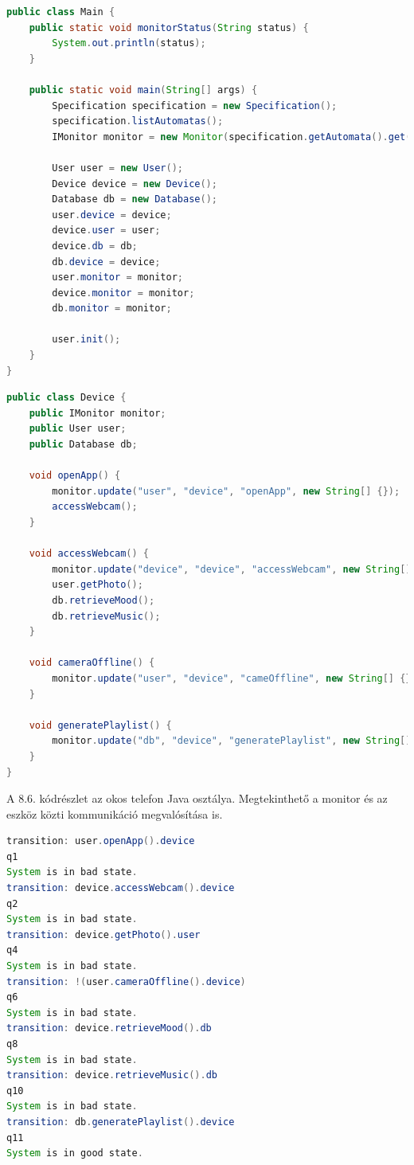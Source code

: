 \begin{lstlisting}[language=java, frame=single, float=ht!, caption={Az okos telefon és hozzá tartozó monitor fel konfigurálásának Java implementációja.},captionpos=b]
public class Main {
	public static void monitorStatus(String status) {
		System.out.println(status);
	}

	public static void main(String[] args) {
		Specification specification = new Specification();
		specification.listAutomatas();
		IMonitor monitor = new Monitor(specification.getAutomata().get(0));

		User user = new User();
		Device device = new Device();
		Database db = new Database();
		user.device = device;
		device.user = user;
		device.db = db;
		db.device = device;
		user.monitor = monitor;
		device.monitor = monitor;
		db.monitor = monitor;

		user.init();
	}
}
\end{lstlisting}

\begin{lstlisting}[language=java, frame=single, float=ht!, caption={Az okos telefon Java osztálya.},captionpos=b]
public class Device {
	public IMonitor monitor;
	public User user;
	public Database db;

	void openApp() {
		monitor.update("user", "device", "openApp", new String[] {});
		accessWebcam();
	}

	void accessWebcam() {
		monitor.update("device", "device", "accessWebcam", new String[] {});
		user.getPhoto();
		db.retrieveMood();
		db.retrieveMusic();
	}

	void cameraOffline() {
		monitor.update("user", "device", "cameOffline", new String[] {});
	}

	void generatePlaylist() {
		monitor.update("db", "device", "generatePlaylist", new String[] {});
	}
}
\end{lstlisting}

A 8.6. kódrészlet az okos telefon Java osztálya.
Megtekinthető a monitor és az eszköz közti kommunikáció megvalósítása is.

\begin{lstlisting}[language=java, frame=single, float=ht!, caption={Monitor kimenete a rendszer működésének egyes fázisaiban.},captionpos=b]
transition: user.openApp().device
q1
System is in bad state.
transition: device.accessWebcam().device
q2
System is in bad state.
transition: device.getPhoto().user
q4
System is in bad state.
transition: !(user.cameraOffline().device)
q6
System is in bad state.
transition: device.retrieveMood().db
q8
System is in bad state.
transition: device.retrieveMusic().db
q10
System is in bad state.
transition: db.generatePlaylist().device
q11
System is in good state.
\end{lstlisting}

